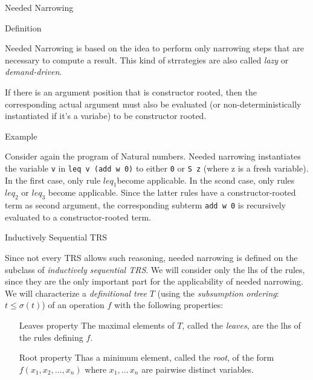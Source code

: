\documentclass{beamer}
\begin{document}
\begin{section}{Needed Narrowing}
  \begin{subsection}{Definition}
    \begin{frame}
      Needed Narrowing is based on the idea to perform only narrowing steps that are necessary to compute a result. This kind of strrategies are also called \textit{lazy} or \textit{demand-driven}.

      If there is an argument position that is constructor rooted, then the corresponding actual argument must also be evaluated (or non-deterministically instantiated if it's a variabe) to be constructor rooted.
    \end{frame}
  \end{subsection}
\begin{subsection}{Example}

\begin{frame}[fragile]

Consider again the program of Natural numbers. Needed narrowing instantiates the variable \verb|v| in \verb|leq v (add w 0)| to either \verb|0| or \verb|S z| (where z is a fresh variable). In the first case, only rule $leq_1$become applicable. In the scond case, only rules $leq_2$ or $leq_3$ become applicable. Since the latter rules have a constructor-rooted term as second argument, the corresponding subterm \verb|add w 0| is recursively evaluated to a constructor-rooted term.  
  
\end{frame}
\end{subsection}
\begin{subsection}{Inductively Sequential TRS}
  \begin{frame}[allowpagebreaks]
Since not every TRS allows such reasoning, needed narrowing is defined on the subclass of \textit{inductively sequential TRS}. We will consider only the lhs of the rules, since they are the  only important part for the applicability of needed narrowing. We will characterize a \textit{definitional tree} $T$ (using the \textit{subsumption ordering}: $t \leq \sigma (t)$) of an operation $f$ with the following properties:
\begin{itemize}
  \setlength{\itemindent}{2cm}
 \item[Leaves property] The maximal elements of $T$, called the \textit{leaves}, are the lhs of the rules defining $f$.
 \item[Root property]Thas a minimum element, called the \textit{root}, of the form $f(x_1,x_2,\ldots,x_n)$ where $x_1,\ldots\,x_n$ are pairwise distinct variables.
\end{itemize}
\end{frame}


\end{subsection}
\end{section}
\end{document}
